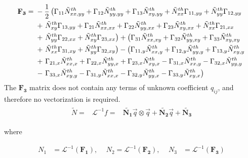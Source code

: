 \documentclass[journal]{new-aiaa}
\begin{document}
\begin{align}
\mathbf{F_3}={}& - \frac{1}{2}\left(\Gamma_{11}\tilde{N}^{th}_{xx,yy} + \Gamma_{12}\tilde{N}^{th}_{yy,yy} + \Gamma_{13}\tilde{N}^{th}_{xy,yy} + \tilde{N}^{th}_{xx}\Gamma_{11,yy} + \tilde{N}^{th}_{yy}\Gamma_{12,yy} \right. \notag\\ &+ \left. \tilde{N}^{th}_{xy}\Gamma_{13,yy} +  \Gamma_{21}\tilde{N}^{th}_{xx,xx} +  \Gamma_{22}\tilde{N}^{th}_{yy,xx} + \Gamma_{23}\tilde{N}^{th}_{xy,xx} +\tilde{N}^{th}_{xx}\Gamma_{21,xx} \right. \notag\\ &+ \left. \tilde{N}^{th}_{yy}\Gamma_{22,xx} +  \tilde{N}^{th}_{xy}\Gamma_{23,xx}\right) + \left(\Gamma_{31}\tilde{N}^{th}_{xx,xy} +  \Gamma_{32}\tilde{N}^{th}_{yy,xy}  +  \Gamma_{33}\tilde{N}^{th}_{xy,xy} \right. \notag\\ &+ \left.   \tilde{N}^{th}_{xx}\Gamma_{31,xy} + \tilde{N}^{th}_{yy}\Gamma_{32,xy} \right)
- \left(\Gamma_{11,y}\tilde{N}^{th}_{xx,y} + \Gamma_{12,y}\tilde{N}^{th}_{yy,y} + \Gamma_{13,y}\tilde{N}^{th}_{xy,y} \right. \notag\\ &+ \left. \Gamma_{21,x}\tilde{N}^{th}_{xx,x} +  \Gamma_{22,x}\tilde{N}^{th}_{yy,x} + \Gamma_{23,x}\tilde{N}^{th}_{xy,x} -\Gamma_{31,x}\tilde{N}^{th}_{xx,y} - \Gamma_{32,x}\tilde{N}^{th}_{yy,y} \right. \notag\\ &- \left. \Gamma_{33,x}\tilde{N}^{th}_{xy,y} - \Gamma_{31,y}\tilde{N}^{th}_{xx,x} - \Gamma_{32,y}\tilde{N}^{th}_{yy,x} - \Gamma_{33,y}\tilde{N}^{th}_{xy,x}\right)
\end{align}
The $\mathbf{F_3}$ matrix does not contain any terms of unknown coefficient $q_{ij}$, and therefore no vectorization is required.
\begin{eqnarray}
\begin{aligned}
\tilde{N} =&\mathcal{L}^{-1}{f}
=&\tilde{\mathbf{N_1}}\vec{q} \otimes \vec{q} +\mathbf{ \tilde{N_2}}\vec{q} + \mathbf{ \tilde{N_3}}
\end{aligned}
\end{eqnarray}

where 

\begin{equation}
\begin{aligned}
N_1&=\mathcal{L}^{-1}\left(\mathbf{F_1}\right), \, \quad
N_2=\mathcal{L}^{-1}\left(\mathbf{F_2}\right) , \, \quad 
N_3&=\mathcal{L}^{-1}\left(\mathbf{F_3}\right)
\end{aligned}
\end{equation}
\end{document}
